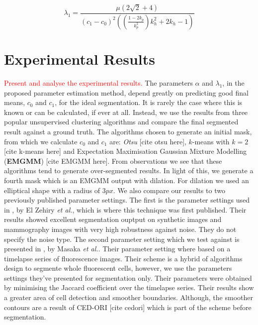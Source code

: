 \begin{equation}
	\lambda_1 = \frac{\mu \left( 2\sqrt{2}+4\right)}{(c_1-c_0)^2\left( \left( \frac{1-2k_p}{k_p^2} \right)k_h^2 +2k_h -1 \right)}
\end{equation}

\section{Experimental Results}
\label{sec:cvgc_experimentalresults}

\textcolor{red}{Present and analyse the experimental results.} The parameters $\alpha$ and $\lambda_1$, in the proposed parameter estimation method, depend greatly on predicting good final means, $c_0$ and $c_1$, for the ideal segmentation. It is rarely the case where this is known or can be calculated, if ever at all. Instead, we use the results from three popular unsupervised clustering algorithms and compare the final segmented result against a ground truth. The algorithms chosen to generate an initial mask, from which we calculate $c_0$ and $c_1$ are: \textit{Otsu} [cite otsu here], $k$-means with $k=2$ [cite k-means here] and Expectation Maximisation Gaussian Mixture Modelling (\textbf{EMGMM}) [cite EMGMM here]. From observations we see that these algorithms tend to generate over-segmented results. In light of this, we generate a fourth mask which is an EMGMM output with dilation. For dilation we used an elliptical shape with a radius of $3px$. We also compare our results  to two previously published parameter settings.
The first is the parameter settings used in \citep{ElZehiry2007}, by El Zehiry \textit{et al.}, which is where this technique was first published. Their results showed excellent segmentation ouptput on synthetic images and mammography images with very high robustness against noise. They do not specify the noise type.
The second parameter setting which we test against is presented in \citep{Maska2013}, by Masaka \textit{et al.}. Their parameter setting where based on a timelapse series of fluorescence images. Their scheme is a hybrid of algorithms design to segmente whole fluorescent cells, however, we use the parameters settings they've presented for segmentation only. Their parameters were obtained by minimising the Jaccard coefficient over the timelapse series. Their results show a greater area of cell detection and smoother boundaries. Although, the smoother contours are a result of CED-ORI [cite cedori] which is part of the scheme before segmentation.

